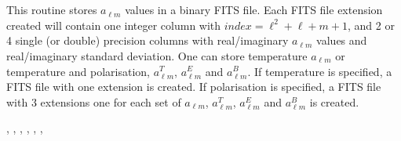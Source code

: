 
\sloppy


 \section[alms2fits*]{ }
\label{sub:alms2fits}
\author{Frode K.~Hansen, Eric Hivon}

\begin{facility}
{This routine stores  $a_{\ell m}$  values in a binary FITS file. Each FITS file
  extension created will contain one integer column with
  $index=\ell^2+\ell+m+1$, and 2 or 4 single (or double) precision columns with real/imaginary  $a_{\ell m}$  values and real/imaginary   standard deviation. One can store temperature $a_{\ell m}$ or temperature and polarisation, $a^T_{\ell m}$, $a^E_{\ell m}$ and $a^B_{\ell m}$. If temperature is specified, a FITS file with one extension is created. If polarisation is specified, a FITS file with 3 extensions one for each set of $a_{\ell m}$, $a_{\ell m}^T$, $a_{\ell m}^E$ and $a_{\ell m}^B$ is created.}
{\modFitstools}
\end{facility}

\begin{f90format}
{%
, %
, %
, %
, %
, %
, %
}
\end{f90format}

